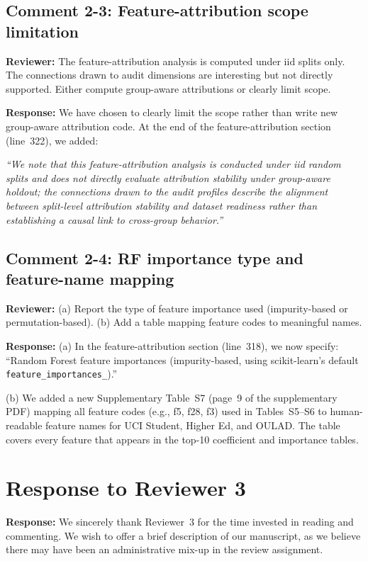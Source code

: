 \documentclass[10pt,letterpaper]{article}
\begin{document}
\subsection*{Comment 2-3: Feature-attribution scope limitation}

\textbf{Reviewer:} The feature-attribution analysis is computed under iid splits only. The connections drawn to audit dimensions are interesting but not directly supported. Either compute group-aware attributions or clearly limit scope.

\textbf{Response:} We have chosen to clearly limit the scope rather than write new group-aware attribution code. At the end of the feature-attribution section (line~322), we added:

\emph{``We note that this feature-attribution analysis is conducted under iid random splits and does not directly evaluate attribution stability under group-aware holdout; the connections drawn to the audit profiles describe the alignment between split-level attribution stability and dataset readiness rather than establishing a causal link to cross-group behavior.''}

\subsection*{Comment 2-4: RF importance type and feature-name mapping}

\textbf{Reviewer:} (a) Report the type of feature importance used (impurity-based or permutation-based). (b) Add a table mapping feature codes to meaningful names.

\textbf{Response:} (a) In the feature-attribution section (line~318), we now specify: ``Random Forest feature importances (impurity-based, using scikit-learn's default \texttt{feature\_importances\_}).'' 

(b) We added a new Supplementary Table~S7 (page~9 of the supplementary PDF) mapping all feature codes (e.g., f5, f28, f3) used in Tables~S5--S6 to human-readable feature names for UCI Student, Higher Ed, and OULAD. The table covers every feature that appears in the top-10 coefficient and importance tables.

\section*{Response to Reviewer 3}

\textbf{Response:} We sincerely thank Reviewer~3 for the time invested in reading and commenting. We wish to offer a brief description of our manuscript, as we believe there may have been an administrative mix-up in the review assignment.
\end{document}
